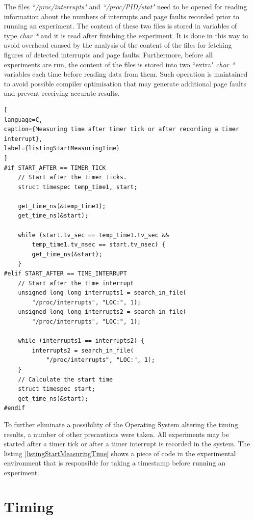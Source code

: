 The files \textit{``/proc/interrupts"} and \textit{``/proc/PID/stat"} need to be opened for reading information about the numbers of interrupts and page faults recorded prior to running an experiment. The content of these two files is stored in variables of type \textit{char *} and it is read after finishing the experiment. It is done in this way to avoid overhead caused by the analysis of the content of the files for fetching figures of detected interrupts and page faults. Furthermore, before all experiments are run, the content of the files is stored into two ``extra" \textit{char *} variables each time before reading data from them. Such operation is maintained to avoid possible compiler optimisation that may generate additional page faults and prevent receiving accurate results.

\begin{lstlisting}[
language=C,
caption={Measuring time after timer tick or after recording a timer interrupt},
label={listingStartMeasuringTime}
]
#if START_AFTER == TIMER_TICK
	// Start after the timer ticks.
	struct timespec temp_time1, start;

	get_time_ns(&temp_time1);
	get_time_ns(&start);

	while (start.tv_sec == temp_time1.tv_sec &&
	    temp_time1.tv_nsec == start.tv_nsec) {
		get_time_ns(&start);
	}
#elif START_AFTER == TIME_INTERRUPT
	// Start after the time interrupt
	unsigned long long interrupts1 = search_in_file(
	    "/proc/interrupts", "LOC:", 1);
	unsigned long long interrupts2 = search_in_file(
	    "/proc/interrupts", "LOC:", 1);

	while (interrupts1 == interrupts2) {
		interrupts2 = search_in_file(
		    "/proc/interrupts", "LOC:", 1);
	}
	// Calculate the start time
	struct timespec start;
	get_time_ns(&start);
#endif
\end{lstlisting}

To further eliminate a possibility of the Operating System altering the timing results, a number of other precautions were taken. All experiments may be started after a timer tick or after a timer interrupt is recorded in the system. The listing \ref{listingStartMeasuringTime} shows a piece of code in the experimental environment that is responsible for taking a timestamp before running an experiment.

\section{Timing}

